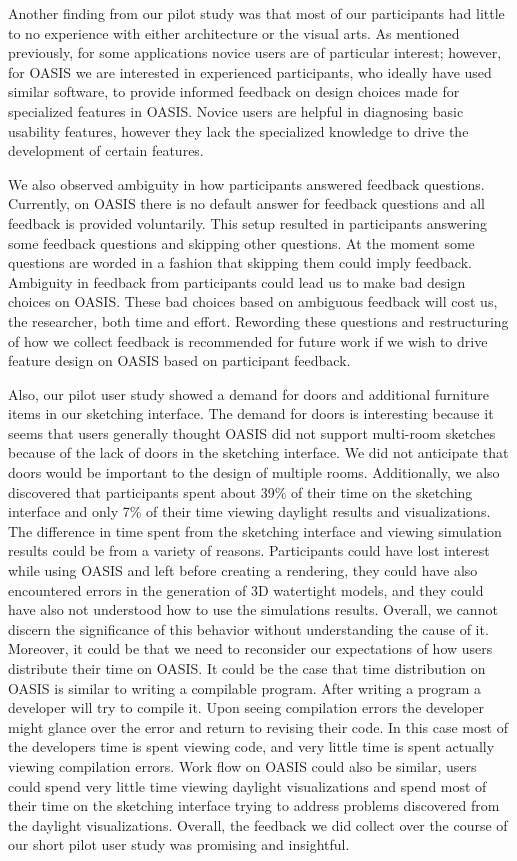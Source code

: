 	Another finding from our pilot study was that most of our participants had little to no experience with either architecture or the visual arts.	
	As mentioned previously, for some applications novice users are of particular interest; 
	however, for OASIS we are interested in experienced participants, who  ideally have used similar software, to provide informed feedback on design choices made for specialized features in OASIS.
	Novice users are helpful in diagnosing basic usability features, however they lack the specialized knowledge to drive the development of certain features.

	We also observed ambiguity in how participants answered feedback questions. 
	Currently, on OASIS there is no default answer for feedback questions and all feedback is provided voluntarily.
	This setup resulted in participants answering some feedback questions and skipping other questions.
	At the moment some questions are worded in a fashion that skipping them could imply feedback.
	Ambiguity in feedback from participants could lead us to make bad design choices on OASIS.
	These bad choices based on ambiguous feedback will cost us, the researcher, both time and effort.
	Rewording these questions and restructuring of how we collect feedback is recommended for future work if we wish to drive feature design on OASIS based on participant feedback.

	Also, our pilot user study showed a demand for doors and additional furniture items in our sketching interface.
	The demand for doors is interesting because it seems that users generally thought OASIS did not support multi-room sketches because of the lack of doors in the sketching interface. 
	We did not anticipate that doors would be important to the design of multiple rooms.
	Additionally, we also discovered that participants spent about 39\% of their time on the sketching interface and only 7\% of their time viewing daylight results and visualizations.
	The difference in time spent from the sketching interface and viewing simulation results could be from a variety of reasons. Participants could have lost interest while using OASIS and left before creating a rendering, they could have also encountered errors in the generation of 3D watertight models, and they could have also not understood how to use the simulations results. Overall, we cannot discern the significance of this behavior without understanding the cause of it. Moreover, it could be that we need to reconsider our expectations of how users distribute their time on OASIS. 
	It could be the case that time distribution on OASIS is similar to writing a compilable program. After writing a program a developer will try to compile it. Upon seeing compilation errors the developer might glance over the error and return to revising their code. In this case most of the developers time is spent viewing code, and very little time is spent actually viewing compilation errors. Work flow on OASIS could also be similar, users could spend very little time viewing daylight visualizations and spend most of their time on the sketching interface trying to address problems discovered from the daylight visualizations.
	Overall, the feedback we did collect over the course of our short pilot user study was promising and insightful.

